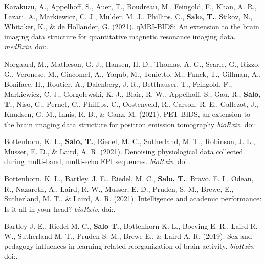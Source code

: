 \documentclass[10pt]{article}
\newcommand{\sectionstyle}{\LARGE \fontfamily{lmr}\selectfont}
\newcommand{\textlink}[3][blue]{\href{#2}{\color{#1}{#3}}}
\begin{document}
\begin{center}\sectionstyle{PREPRINTS}\end{center}

\begin{hangparas}{.25in}{1}

	Karakuzu, A., Appelhoff, S., Auer, T., Boudreau, M., Feingold, F., Khan, A. R.,
	Lazari, A., Markiewicz, C. J., Mulder, M. J., Phillips, C., \textbf{Salo, T.},
	Stikov, N., Whitaker, K., \& de Hollander, G. (2021).
	qMRI-BIDS: An extension to the brain imaging data structure for quantitative magnetic resonance imaging data.
	\emph{medRxiv}.
	doi:\textlink{https://doi.org/10.1101/2021.10.22.21265382}{10.1101/2021.10.22.21265382}.

	\bigskip

	Norgaard, M., Matheson, G. J., Hansen, H. D., Thomas, A. G., Searle, G., Rizzo, G.,
	Veronese, M., Giacomel, A., Yaqub, M., Tonietto, M., Funck, T., Gillman, A.,
	Boniface, H., Routier, A., Dalenberg, J. R., Betthauser, T., Feingold, F.,
	Markiewicz, C. J., Gorgolewski, K. J., Blair, R. W., Appelhoff, S., Gau, R.,
	\textbf{Salo, T.}, Niso, G., Pernet, C., Phillips, C., Oostenveld, R., Carson, R. E.,
	Gallezot, J., Knudsen, G. M., Innis, R. B., \& Ganz, M. (2021).
	PET-BIDS, an extension to the brain imaging data structure for positron emission tomography
	\emph{bioRxiv}.
	doi:\textlink{https://doi.org/10.1101/2021.06.16.448390}{10.1101/2021.06.16.448390}.

	\bigskip

	Bottenhorn, K. L., \textbf{Salo, T.}, Riedel, M. C., Sutherland, M. T., Robinson, J. L.,
	Musser, E. D., \& Laird, A. R. (2021).
	Denoising physiological data collected during multi-band, multi-echo EPI sequences.
	\emph{bioRxiv}.
	doi:\textlink{https://doi.org/10.1101/2021.04.01.437293}{10.1101/2021.04.01.437293}.

	\bigskip

	Bottenhorn, K. L., Bartley, J. E., Riedel, M. C., \textbf{Salo, T.}, Bravo, E. I.,
	Odean, R., Nazareth, A., Laird, R. W., Musser, E. D., Pruden, S. M., Brewe, E.,
	Sutherland, M. T., \& Laird, A. R. (2021).
	Intelligence and academic performance: Is it all in your head?
	\emph{bioRxiv}.
	doi:\textlink{https://doi.org/10.1101/2021.01.23.427928}{10.1101/2021.01.23.427928}.

	\bigskip

	Bartley J. E., Riedel M. C., \textbf{Salo T.}, Bottenhorn K. L.,
	Boeving E. R., Laird R. W., Sutherland M. T., Pruden S. M., Brewe E., \&
	Laird A. R. (2019).
	Sex and pedagogy influences in learning-related reorganization of brain activity.
	\emph{bioRxiv}. doi:\textlink{https://doi.org/10.1101/791301}{10.1101/791301}.

\end{hangparas}
\end{document}
